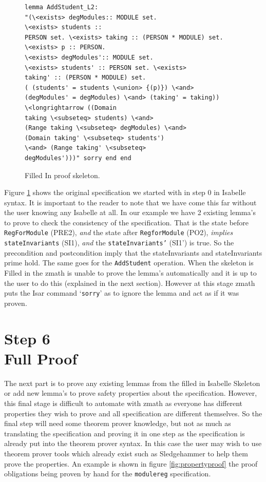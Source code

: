 \begin{figure}[H]
\begin{minipage}{0.45\textwidth}
\begin{scriptsize}
\begin{BVerbatim}
lemma AddStudent_L2: 
"(\<exists> degModules:: MODULE set. 
\<exists> students ::
PERSON set. \<exists> taking :: (PERSON * MODULE) set. 
\<exists> p :: PERSON.
\<exists> degModules':: MODULE set. 
\<exists> students' :: PERSON set. \<exists>
taking' :: (PERSON * MODULE) set. 
( (students' = students \<union> {(p)}) \<and>
(degModules' = degModules) \<and> (taking' = taking)) 
\<longrightarrow ((Domain
taking \<subseteq> students) \<and> 
(Range taking \<subseteq> degModules) \<and>
(Domain taking' \<subseteq> students') 
\<and> (Range taking' \<subseteq>
degModules')))" sorry end end
\end{BVerbatim}
\end{scriptsize}
\end{minipage}
\caption{Filled In proof skeleton. \label{fig:fillinFullexample}}
\end{figure}

Figure \ref{fig:fillinFullexample} shows the original specification we started
with in step 0 in Isabelle syntax. It is important to the reader to note that we
have come this far without the user knowing any Isabelle at all. In our example
we have 2 existing lemma's to prove to check the consistency of the
specification. That is the state before \texttt{RegForModule} (PRE2), \emph{and}
the state after \texttt{RegforModule} (PO2), \emph{implies}
\texttt{stateInvariants} (SI1), \emph{and} the \texttt{stateInvariants'} (SI1')
is true. So the precondition and postcondition imply that the stateInvariants
and stateInvariants prime hold. The same goes for the \texttt{AddStudent}
operation. When the skeleton is Filled in the \gls{zmath} is unable to prove the
lemma's automatically and it is up to the user to do this (explained in the next
section). However at this stage \gls{zmath} puts the Isar command
`\texttt{sorry}' as to ignore the lemma and act as if it was proven.

\section{Step 6\\Full Proof}

The next part is to prove any existing lemmas from the filled in Isabelle
Skeleton or add new lemma's to prove safety properties about the specification.
However, this final stage is difficult to automate with \gls{zmath} as everyone
has different properties they wish to prove and all specification are different
themselves. So the final step will need some theorem prover knowledge, but not
as much as translating the specification and proving it in one step as the
specification is already put into the theorem prover syntax. In this case the
user may wish to use theorem prover tools which already exist such as
Sledgehammer \cite{sledgehammer} to help them prove the properties. An example
is shown in figure \ref{fig:propertyproof} the proof obligations being proven by
hand for the \texttt{modulereg} specification.

